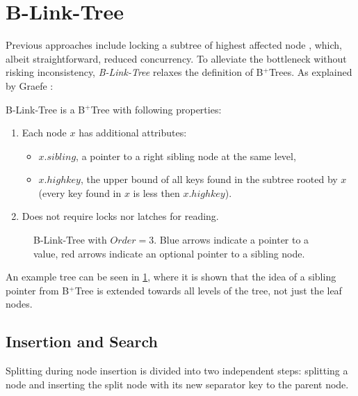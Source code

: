 \section{B-Link-Tree}\label{section:b-link-tree}

Previous approaches include locking a subtree of highest affected node \cite{samadi1976b}, which, albeit straightforward, reduced concurrency. To alleviate the bottleneck without risking inconsistency, \textit{B-Link-Tree} relaxes the definition of B$^+$Trees. As explained by Graefe \cite{goetz-tech}:

\begin{definition}
  B-Link-Tree is a B$^+$Tree with following properties:
  \begin{enumerate}
    \item Each node $x$ has additional attributes:
          \begin{itemize}
            \item $x.\mathit{sibling}$, a pointer to a right sibling node at the same level,
            \item $x.highkey$, the upper bound of all keys found in the subtree rooted by $x$ (every key found in $x$ is less then $x.highkey$).
          \end{itemize}
    \item Does not require locks nor latches for reading.
  \end{enumerate}
\end{definition}

\begin{figure}[H]
  \centering
  
  \caption[B-Link-Tree with $\mathit{Order} = 3$.]{B-Link-Tree with $\mathit{Order} = 3$. Blue arrows indicate a pointer to a value, red arrows indicate an optional pointer to a sibling node.}
  \label{figure:b-link-tree}
\end{figure}

An example tree can be seen in \ref{figure:b-link-tree}, where it is shown that the idea of a sibling pointer from B$^+$Tree is extended towards all levels of the tree, not just the leaf nodes. 

\subsection{Insertion and Search}

Splitting during node insertion is divided into two independent steps: splitting a node and inserting the split node with its new separator key to the parent node.

